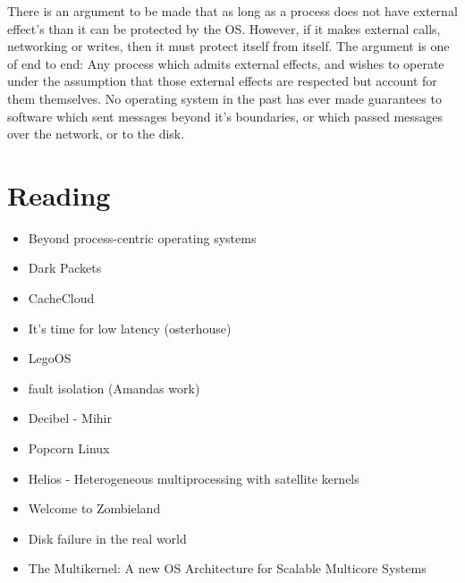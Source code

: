 There is an argument to be made that as long as a process does not have
external effect's than it can be protected by the OS. However, if it makes
external calls, networking or writes, then it must protect itself from itself.
The argument is one of end to end: Any process which admits external effects,
and wishes to operate under the assumption that those external effects are
respected but account for them themselves. No operating system in the past has
ever made guarantees to software which sent messages beyond it's boundaries, or
which passed messages over the network, or to the disk.

\section{Reading}
\label{sec:reading}
\begin{itemize}
    \item{Beyond process-centric operating systems}~\cite{189914}\rpaper{}
    \item{Dark Packets}\rabstract{}
    \item{CacheCloud}~\cite{cachecloud}\rintro{+}
    \item{It's time for low latency (osterhouse)}
    \item{LegoOS}\cite{legoos}\rpaper{}
    \item{fault isolation (Amandas work)}\rintro{}
    \item{Decibel - Mihir}\rabstract{}
    \item{Popcorn Linux}
    \item{Helios - Heterogeneous multiprocessing with satellite kernels}~\cite{helios}\rabstract{}
    \item{Welcome to Zombieland}~\cite{zombieland}\rintro{}
    \item{Disk failure in the real world}~\cite{Schroeder:2007:DFR:1267903.1267904}\rabstract{}
    \item{The Multikernel: A new OS Architecture for Scalable Multicore Systems}~\cite{the-multikernel}\rabstract{}

\end{itemize}
